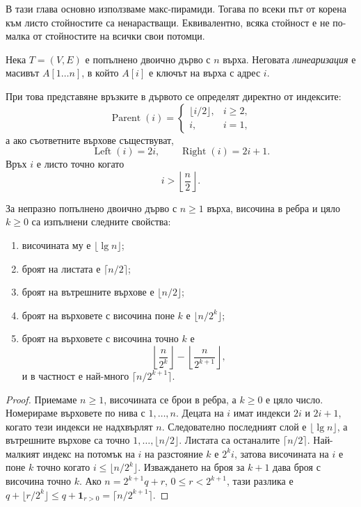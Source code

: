 В тази глава основно използваме макс-пирамиди. Тогава по всеки път от корена към листо стойностите са ненарастващи. Еквивалентно, всяка стойност е не по-малка от стойностите на всички свои потомци.

\begin{defn}
Нека $T=(V,E)$ е попълнено двоично дърво с $n$ върха. Неговата \emph{линеаризация} е масивът $A[1\ldots n]$, в който $A[i]$ е ключът на върха с адрес $i$.
\end{defn}

При това представяне връзките в дървото се определят директно от индексите:
\[
\operatorname{Parent}(i)=
\begin{cases}
\lfloor i/2\rfloor, & i\geq 2,\\
i, & i=1,
\end{cases}
\]
а ако съответните върхове съществуват,
\[
\operatorname{Left}(i)=2i,\qquad
\operatorname{Right}(i)=2i+1.
\]
Връх $i$ е листо точно когато
\[
i>\left\lfloor\frac n2\right\rfloor.
\]

\begin{prop}
За непразно попълнено двоично дърво с $n\ge1$ върха, височина в ребра и цяло $k\ge0$ са изпълнени следните свойства:
\begin{enumerate}
    \item височината му е $\lfloor\lg n\rfloor$;
    \item броят на листата е $\lceil n/2\rceil$;
    \item броят на вътрешните върхове е $\lfloor n/2\rfloor$;
    \item броят на върховете с височина поне $k$ е $\lfloor n/2^k\rfloor$;
    \item броят на върховете с височина точно $k$ е
    \[
    \left\lfloor\frac{n}{2^k}\right\rfloor-
    \left\lfloor\frac{n}{2^{k+1}}\right\rfloor,
    \]
    и в частност е най-много $\lceil n/2^{k+1}\rceil$.
\end{enumerate}
\end{prop}



\begin{proof}
Приемаме $n\ge1$, височината се брои в ребра, а $k\ge0$ е цяло число. Номерираме върховете по нива с $1,\ldots,n$. Децата на $i$ имат индекси $2i$ и $2i+1$, когато тези индекси не надхвърлят $n$. Следователно последният слой е $\lfloor\lg n\rfloor$, а вътрешните върхове са точно $1,\ldots,\lfloor n/2\rfloor$. Листата са останалите $\lceil n/2\rceil$. Най-малкият индекс на потомък на $i$ на разстояние $k$ е $2^ki$, затова височината на $i$ е поне $k$ точно когато $i\le\lfloor n/2^k\rfloor$. Изваждането на броя за $k+1$ дава броя с височина точно $k$. Ако $n=2^{k+1}q+r$, $0\le r<2^{k+1}$, тази разлика е $q+\lfloor r/2^k\rfloor\le q+\mathbf1_{r>0}=\lceil n/2^{k+1}\rceil$.
\end{proof}

